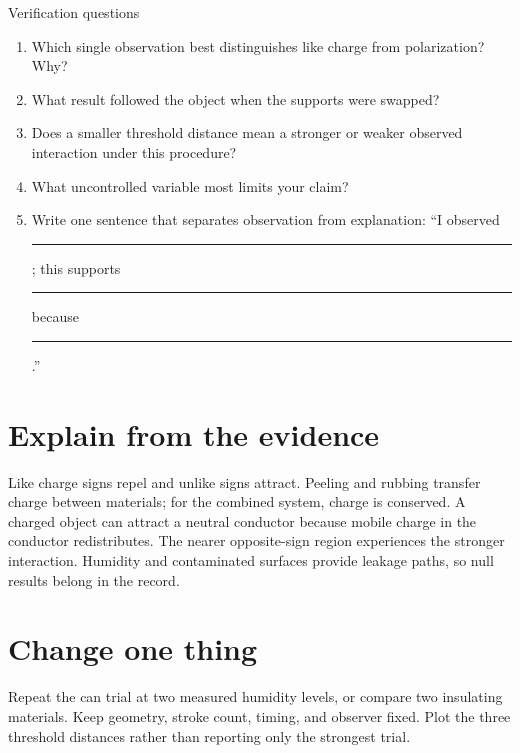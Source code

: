 \begin{telospanel}{Verification questions}
\begin{enumerate}
  \item Which single observation best distinguishes like charge from
    polarization? Why?
  \item What result followed the object when the supports were swapped?
  \item Does a smaller threshold distance mean a stronger or weaker observed
    interaction under this procedure?
  \item What uncontrolled variable most limits your claim?
  \item Write one sentence that separates observation from explanation:
    ``I observed \rule{.28\linewidth}{.3pt}; this supports
    \rule{.28\linewidth}{.3pt} because \rule{.23\linewidth}{.3pt}.''
\end{enumerate}
\end{telospanel}

\section{Explain from the evidence}

Like charge signs repel and unlike signs attract. Peeling and rubbing transfer
charge between materials; for the combined system, charge is conserved. A
charged object can attract a neutral conductor because mobile charge in the
conductor redistributes. The nearer opposite-sign region experiences the
stronger interaction. Humidity and contaminated surfaces provide leakage paths,
so null results belong in the record.

\section{Change one thing}

Repeat the can trial at two measured humidity levels, or compare two insulating
materials. Keep geometry, stroke count, timing, and observer fixed. Plot the
three threshold distances rather than reporting only the strongest trial.

\sourcefoot

